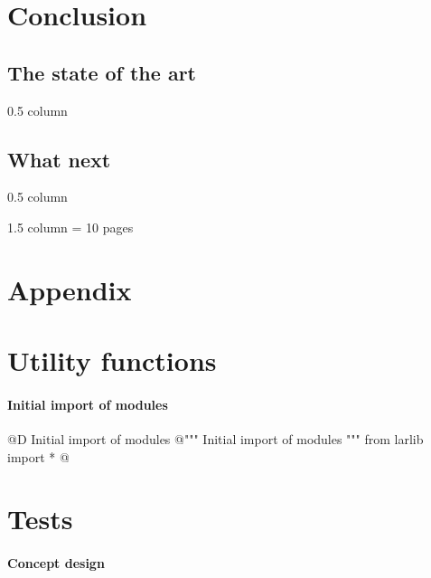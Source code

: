 \documentclass[11pt,oneside]{article}    %
\begin{document}
\section{Conclusion}\label{sec:conclusion}
\subsection{The state of the art}
0.5 column
\subsection{What next}
0.5 column



1.5 column
= 10 pages

\appendix
\section{Appendix}
\section{Utility functions}

\paragraph{Initial import of modules}

@D Initial import of modules
@{""" Initial import of modules """
from larlib import *
@}

\section{Tests}


\paragraph{Concept design}
\end{document}
